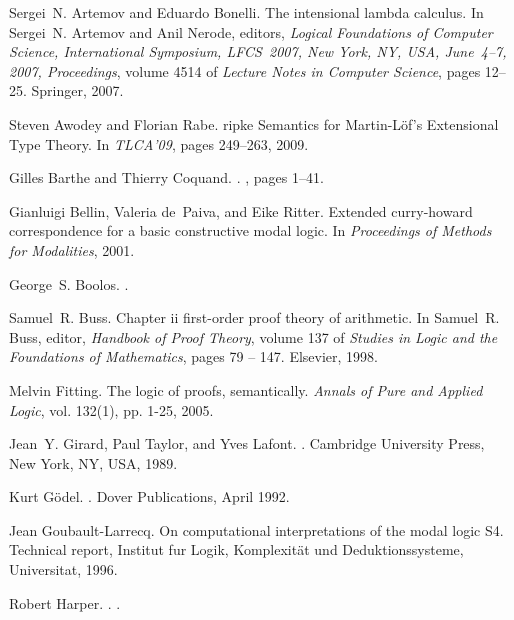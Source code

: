 \documentclass[11pt]{entcs}
\begin{document}
{\begin{thebibliography}{10}
Sergei~N. Artemov and Eduardo Bonelli.
\newblock The intensional lambda calculus.
\newblock In Sergei~N. Artemov and Anil Nerode, editors, {\em Logical
  Foundations of Computer Science, International Symposium, {LFCS}~2007, {N}ew
  {Y}ork, {NY}, {USA}, {J}une~4--7, 2007, Proceedings}, volume 4514 of {\em
  Lecture Notes in Computer Science}, pages 12--25. Springer, 2007.

Steven Awodey and Florian Rabe.
ripke {S}emantics for {Martin-L\"{o}f}'s {E}xtensional {T}ype {T}heory.
\newblock In {\em TLCA'09}, pages 249--263, 2009.

Gilles Barthe and Thierry Coquand.
.
, pages 1--41.

Gianluigi Bellin, Valeria de~Paiva, and Eike Ritter.
\newblock Extended curry-howard correspondence for a basic constructive modal
  logic.
\newblock In {\em Proceedings of Methods for Modalities}, 2001.

George~S. Boolos.
.

Samuel~R. Buss.
\newblock Chapter ii first-order proof theory of arithmetic.
\newblock In Samuel~R. Buss, editor, {\em Handbook of Proof Theory}, volume 137
  of {\em Studies in Logic and the Foundations of Mathematics}, pages 79 --
  147. Elsevier, 1998.

Melvin Fitting.
\newblock The logic of proofs, semantically.
\newblock \textit{Annals of Pure and Applied Logic}, vol. 132(1), pp. 1-25, 2005.


Jean~Y. Girard, Paul Taylor, and Yves Lafont.
.
\newblock Cambridge University Press, New York, NY, USA, 1989.

Kurt G\"{o}del.
.
\newblock Dover Publications, April 1992.

Jean Goubault-Larrecq.
\newblock On computational interpretations of the modal logic {S4}.
\newblock Technical report, Institut fur Logik, Komplexit\"at und Deduktionssysteme, Universitat, 1996.

Robert Harper.
.
.


\end{thebibliography}}
\end{document}

